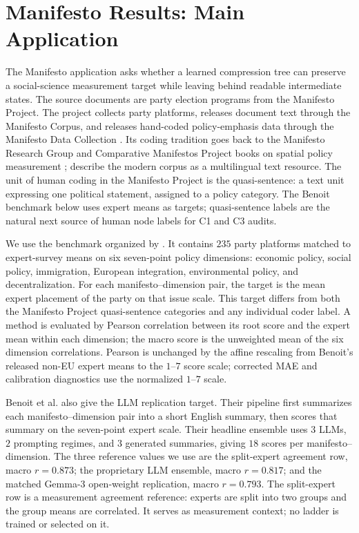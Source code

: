 \section{Manifesto Results: Main Application}\label{sec:min-manifesto-results}

The Manifesto application asks whether a learned compression tree can preserve
a social-science measurement target while leaving behind readable intermediate
states. The source documents are party election programs from the Manifesto
Project. The project collects party platforms, releases document text through
the Manifesto Corpus, and releases hand-coded policy-emphasis data through the
Manifesto Data Collection \citep{ManifestoProject2025a,ManifestoCorpus2025}.
Its coding tradition goes back to the Manifesto Research Group and
Comparative Manifestos Project books on spatial policy measurement
\citep{BudgeRobertsonHearl1987,BudgeEtAl2001,KlingemannEtAl2006,VolkensEtAl2013};
\citet{MerzEtAl2016} describe the modern corpus as a multilingual text
resource. The unit of human coding in the Manifesto Project is the
quasi-sentence: a text unit expressing one political statement, assigned to a
policy category. The Benoit benchmark below uses expert means as targets;
quasi-sentence labels are the natural next source of human node labels for C1
and C3 audits.

We use the benchmark organized by \citet{BenoitEtAl2025}. It contains $235$
party platforms matched to expert-survey means on six seven-point policy
dimensions: economic policy, social policy, immigration, European integration,
environmental policy, and decentralization. For each manifesto--dimension
pair, the target is the mean expert placement of the party on that issue
scale. This target differs from both the Manifesto Project quasi-sentence
categories and any individual coder label. A method is evaluated by Pearson
correlation between its root score and the expert mean within each dimension;
the macro score is the unweighted mean of the six dimension correlations.
Pearson is unchanged by the affine rescaling from Benoit's released non-EU
expert means to the $1$--$7$ score scale; corrected MAE and calibration
diagnostics use the normalized $1$--$7$ scale.

Benoit et al. also give the LLM replication target. Their pipeline first
summarizes each manifesto--dimension pair into a short English summary, then
scores that summary on the seven-point expert scale. Their headline ensemble
uses $3$ LLMs, $2$ prompting regimes, and $3$ generated summaries, giving $18$
scores per manifesto--dimension. The three reference values we use are the
split-expert agreement row, macro $r=0.873$; the proprietary LLM ensemble,
macro $r=0.817$; and the matched Gemma-3 open-weight replication, macro
$r=0.793$. The split-expert row is a measurement agreement reference:
experts are split into two groups and the group means are correlated. It
serves as measurement context; no ladder is trained or selected on it.

